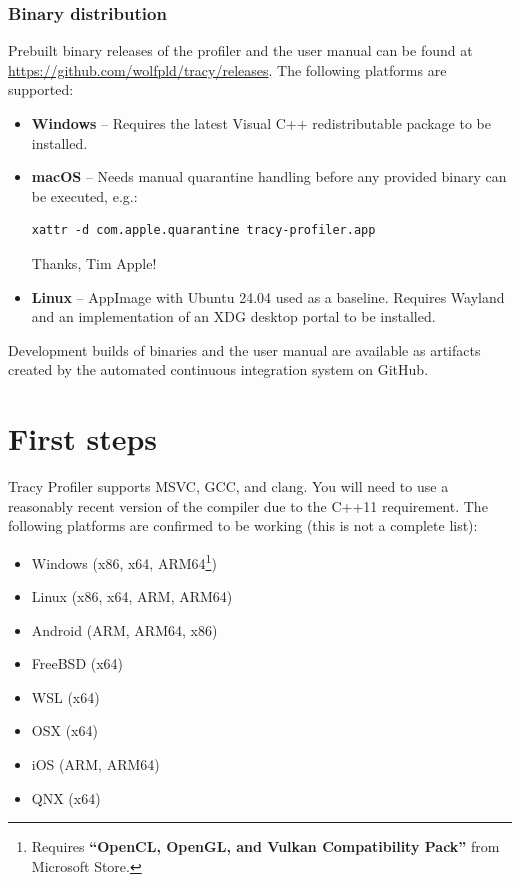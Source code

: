 \documentclass[hidelinks,titlepage,a4paper,twoside]{article}
\begin{document}
\subsubsection{Binary distribution}

Prebuilt binary releases of the profiler and the user manual can be found at \url{https://github.com/wolfpld/tracy/releases}. The following platforms are supported:

\begin{itemize}
\item \textbf{Windows} -- Requires the latest Visual C++ redistributable package to be installed.
\item \textbf{macOS} -- Needs manual quarantine handling before any provided binary can be executed, e.g.:
\begin{lstlisting}
xattr -d com.apple.quarantine tracy-profiler.app
\end{lstlisting}
Thanks, Tim Apple!
\item \textbf{Linux} -- AppImage with Ubuntu 24.04 used as a baseline. Requires Wayland and an implementation of an XDG desktop portal to be installed.
\end{itemize}

Development builds of binaries and the user manual are available as artifacts created by the automated continuous integration system on GitHub.

\section{First steps}
\label{firststeps}

Tracy Profiler supports  MSVC, GCC, and clang. You will need to use a reasonably recent version of the compiler due to the C++11 requirement. The following platforms are confirmed to be working (this is not a complete list):

\begin{itemize}
\item Windows (x86, x64, ARM64\footnote{Requires \textbf{\enquote{OpenCL, OpenGL, and Vulkan Compatibility Pack}} from Microsoft Store.})
\item Linux (x86, x64, ARM, ARM64)
\item Android (ARM, ARM64, x86)
\item FreeBSD (x64)
\item WSL (x64)
\item OSX (x64)
\item iOS (ARM, ARM64)
\item QNX (x64)
\end{itemize}
\end{document}
